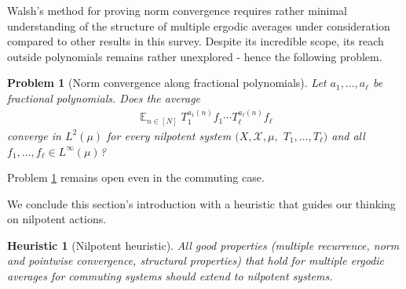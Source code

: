 \documentclass[11pt]{amsart}
\newtheorem{problem}{Problem}
\newtheorem{heuristic}[lemma]{Heuristic}
\theoremstyle{definition}
\DeclareMathOperator*{\E}{\mathbb{E}}
\newcommand{\CX}{{\mathcal X}}
\newcommand{\1}{{\mathbf{1}}}
\begin{document}
Walsh's method for proving norm convergence requires rather minimal understanding of the structure of multiple ergodic averages under consideration compared to other results in this survey. Despite its incredible scope, its reach outside polynomials remains rather unexplored - hence the following problem. 
\begin{problem}[Norm convergence along fractional polynomials]\label{Pr: norm convergence fractional polynomials}
        Let $a_1, \ldots, a_\ell$ be fractional polynomials. Does the average
    \begin{align*}
        \E_{n\in[N]}T_1^{a_1(n)}f_1\cdots T_\ell^{a_\ell(n)}f_\ell
    \end{align*}
    converge in $L^2(\mu)$ for every nilpotent system $(X, \CX, \mu,$\! $T_1, \ldots, T_\ell)$ and all $f_1, \ldots, f_\ell\in L^\infty(\mu)$?
\end{problem}
Problem \ref{Pr: norm convergence fractional polynomials} remains open even in the commuting case.

We conclude this section's introduction with a heuristic that guides our thinking on nilpotent actions.
\begin{heuristic}[Nilpotent heuristic]\label{H: nilpotent heuristic}
    All good properties (multiple recurrence, norm and pointwise convergence, structural properties) that hold for multiple ergodic averages for commuting systems should extend to nilpotent systems.
\end{heuristic}
\end{document}
